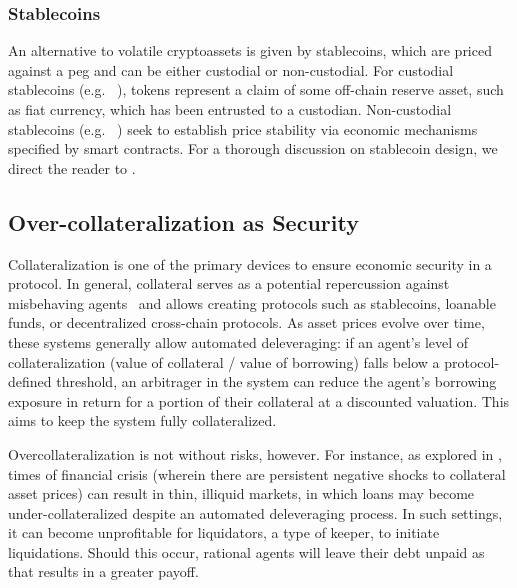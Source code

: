 \subsubsection{Stablecoins}
An alternative to volatile cryptoassets is given by stablecoins, which are priced against a peg and can be either custodial or non-custodial.
For custodial stablecoins (e.g. ~\cite{web:usdc}), tokens represent a claim of some off-chain reserve asset, such as fiat currency, which has been entrusted to a custodian.
Non-custodial stablecoins (e.g. ~\cite{whitepaper:maker}) seek to establish price stability via economic mechanisms specified by smart contracts.
For a thorough discussion on stablecoin design, we direct the reader to \cite{Klages-Mundt2020}.

\subsection{Over-collateralization as Security}
Collateralization is one of the primary devices to ensure economic security in a protocol.
In general, collateral serves as a potential repercussion against misbehaving agents~\cite{harz2019balance} and allows creating protocols such as stablecoins, loanable funds, or decentralized cross-chain protocols.
As asset prices evolve over time, these systems generally allow automated deleveraging: if an agent's level of collateralization (value of collateral / value of borrowing) falls below a protocol-defined threshold, an arbitrager in the system can reduce the agent's borrowing exposure in return for a portion of their collateral at a discounted valuation. This aims to keep the system fully collateralized.

Overcollateralization is not without risks, however. For instance, as explored in \cite{gudgeon2020decentralized,kao2020analysis}, times of financial crisis (wherein there are persistent negative shocks to collateral asset prices) can result in thin, illiquid markets, in which loans may become under-collateralized despite an automated deleveraging process. 
In such settings, it can become unprofitable for liquidators, a type of keeper, to initiate liquidations. 
Should this occur, rational agents will leave their debt unpaid as that results in a greater payoff.
